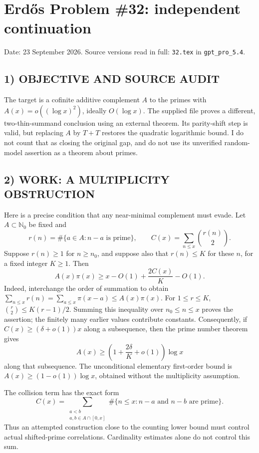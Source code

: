 \section{Erd\H{o}s Problem \#32: independent continuation}
\noindent Date: 23 September 2026. Source versions read in full: \texttt{32.tex} in \texttt{gpt\_pro\_5.4}.

\subsection*{1) OBJECTIVE AND SOURCE AUDIT}
The target is a cofinite additive complement $A$ to the primes with
$A(x)=o((\log x)^2)$, ideally $O(\log x)$. The supplied file proves a
different, two-thin-summand conclusion using an external theorem. Its
parity-shift step is valid, but replacing $A$ by $T+T$ restores the quadratic
logarithmic bound. I do not count that as closing the original gap, and do
not use its unverified random-model assertion as a theorem about primes.

\subsection*{2) WORK: A MULTIPLICITY OBSTRUCTION}
Here is a precise condition that any near-minimal complement must evade.
Let $A\subset\mathbb N_0$ be fixed and
\[
 r(n)=\#\{a\in A:n-a\text{ is prime}\},\qquad
 C(x)=\sum_{n\le x}\binom{r(n)}2.
\]
Suppose $r(n)\ge1$ for $n\ge n_0$, and suppose also that $r(n)\le K$
for these $n$, for a fixed integer $K\ge1$. Then
\[
 A(x)\pi(x)\ge x-O(1)+\frac{2C(x)}K-O(1).
\]
Indeed, interchange the order of summation to obtain
$\sum_{n\le x}r(n)=\sum_{a\le x}\pi(x-a)\le A(x)\pi(x)$.
For $1\le r\le K$,
$\binom r2\le K(r-1)/2$. Summing this inequality over $n_0\le n\le x$
proves the assertion; the finitely many earlier values contribute constants.
Consequently, if $C(x)\ge(\delta+o(1))x$ along a subsequence, then the
prime number theorem gives
\[
 A(x)\ge\left(1+\frac{2\delta}{K}+o(1)\right)\log x
\]
along that subsequence. The unconditional elementary first-order bound is
$A(x)\ge(1-o(1))\log x$, obtained without the multiplicity assumption.

The collision term has the exact form
\[
 C(x)=\sum_{\substack{a<b\\a,b\in A\cap[0,x]}}
 \#\{n\le x:n-a\text{ and }n-b\text{ are prime}\}.
\]
Thus an attempted construction close to the counting lower bound must
control actual shifted-prime correlations. Cardinality estimates alone
do not control this sum.

